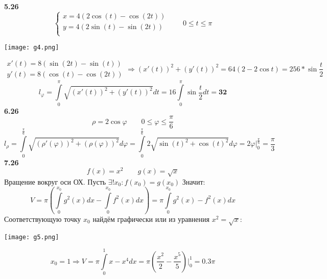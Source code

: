 \documentclass[14pt,a4paper]{scrartcl}
\theoremstyle{definition}
\theoremstyle{remark}
\theoremstyle{definition}
\theoremstyle{definition}
\begin{document}
\pagebreak\\
\textbf{5.26}
$$
\left\lbrace \begin{gathered}
 x = 4(2 \cos{(t)} - \cos{(2t)}  )\\
 y = 4(2 \sin{(t)} - \sin{(2t)}  )\\
\end{gathered} \right. \qquad 0 \leq t \leq \pi
$$
\begin{center}
\texttt{[image: g4.png]}
\end{center}
$$
\begin{gathered}
 x'(t) = 8(\sin{(2t)} - \sin{(t)}  )\\
 y'(t) = 8(\cos{(t)} - \cos{(2t)}  )
\end{gathered}
\Longrightarrow (x'(t))^2 + (y'(t))^2 = 64(2 - 2 \cos{t} ) = 256* \sin{\frac{t}{2}}
$$
$$
l_{\varphi} =  \int\limits_{0}^{\pi}{\sqrt{ (x'(t))^2 + (y'(t))^2 }dt} =  16\int\limits_{0}^{\pi}{\sin{ \frac{t}{2} } dt} = \mathbf{32}
$$
\textbf{6.26}
$$
\rho = 2 \cos{\varphi} \qquad 0\leq \varphi \leq \frac{\pi}{6}
$$
$$
l_\rho =  \int\limits_{0}^{ \frac{\pi}{6} }{ \sqrt{ (\rho'(\varphi))^2 + (\rho(\varphi))^2 }d \varphi } =  \int\limits_{0}^{ \frac{\pi}{6} }{ 2\sqrt{ \sin{ (t)}^2 + \cos{(t)}^2   } d \varphi } = 2 \varphi \Big|_{0}^{ \frac{\pi}{6} } = \frac{\pi}{3}
$$
\textbf{7.26}
$$f(x) = x^2 \qquad g(x) = \sqrt{x}$$
Вращение вокруг оси ОХ. Пусть $\exists! x_0 : f(x_0) = g(x_0)$ Значит:\\
$$V =  \pi \left(  \int\limits_{0}^{x_0}{g^2(x)dx} -  \int\limits_{0}^{x_0}{f^2(x)dx} \right) = \pi  \int\limits_{0}^{x_0}{g^2(x) - f^2(x)dx} $$
Соответствующую точку $x_0$ найдём графически или из уравнения $x^2 = \sqrt{x}:$
\begin{center}
\texttt{[image: g5.png]}
\end{center}
$$x_0 = 1 \Longrightarrow V = \pi \int\limits_{0}^{1}{x - x^4dx} = \pi \left( \frac{x^2}{2} - \frac{x^5}{5} \right)  \Big|_0^1= \mathbf{0.3}\pi $$
\end{document}
